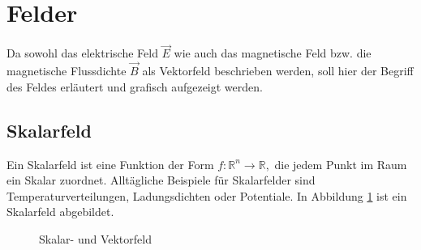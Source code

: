 %
%
% 
%
%
\section{Felder\label{maxwell:mathFormulierung}}

Da sowohl das elektrische Feld $\vec{E}$ wie auch das magnetische Feld bzw. die magnetische Flussdichte $\vec{B}$ als Vektorfeld beschrieben werden, soll hier der Begriff des Feldes erläutert und grafisch aufgezeigt werden.

\subsection{Skalarfeld\label{maxwell:skalarfeld}}

Ein Skalarfeld ist eine Funktion der Form
\( f:\mathbb{R}^n \rightarrow \mathbb{R}, \) 
die jedem Punkt im Raum ein Skalar zuordnet.
Alltägliche Beispiele für Skalarfelder sind Temperaturverteilungen, Ladungsdichten oder Potentiale. In Abbildung \ref{maxwell:skalarGrad} ist ein Skalarfeld abgebildet.



\begin{figure}
	\centering
	\caption{Skalar- und Vektorfeld}
	\label{maxwell:skalarGrad}
\end{figure}

